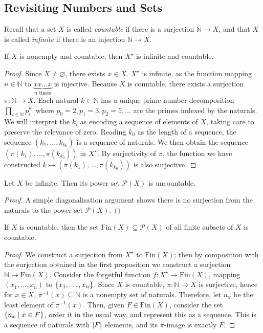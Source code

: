 \subsection{Revisiting Numbers and Sets}
Recall that a set \( X \) is called \emph{countable} if there is a surjection \( \mathbb N \to X \), and that \( X \) is called \emph{infinite} if there is an injection \( \mathbb N \to X \).
\begin{proposition}
	If \( X \) is nonempty and countable, then \( X^\star \) is infinite and countable.
\end{proposition}
\begin{proof}
	Since \( X \neq \varnothing \), there exists \( x \in X \).
	\( X^\star \) is infinite, as the function mapping \( n \in \mathbb N \) to \( \underbrace{xx\dots x}_{n \text{ times}} \) is injective.
	Because \( X \) is countable, there exists a surjection \( \pi : \mathbb N \to X \).
	Each natural \( k \in \mathbb N \) has a unique prime number decomposition \( \prod_{i \in \mathbb N} p_i^{k_i} \) where \( p_0 = 2, p_1 = 3, p_2 = 5, \dots \) are the primes indexed by the naturals.
	We will interpret the \( k_i \) as encoding a sequence of elements of \( X \), taking care to preserve the relevance of zero.
	Reading \( k_0 \) as the length of a sequence, the sequence \( (k_1, \dots, k_{k_0}) \) is a sequence of naturals.
	We then obtain the sequence \( (\pi(k_1), \dots, \pi(k_{k_0})) \) in \( X^\star \).
	By surjectivity of \( \pi \), the function we have constructed \( k \mapsto (\pi(k_1), \dots, \pi(k_{k_0})) \) is also surjective.
\end{proof}
\begin{theorem}
	Let \( X \) be infinite. Then its power set \( \mathcal P(X) \) is uncountable.
\end{theorem}
\begin{proof}
	A simple diagonalisation argument shows there is no surjection from the naturals to the power set \( \mathcal P(X) \).
\end{proof}
\begin{proposition}
	If \( X \) is countable, then the set \( \mathrm{Fin}(X) \subseteq \mathcal P(X) \) of all finite subsets of \( X \) is countable.
\end{proposition}
\begin{proof}
	We construct a surjection from \( X^\star \) to \( \mathrm{Fin}(X) \); then by composition with the surjection obtained in the first proposition we construct a surjection \( \mathbb N \to \mathrm{Fin}(X) \).
	Consider the forgetful function \( f \colon X^\star \to \mathrm{Fin}(X) \), mapping \( (x_1, \dots, x_n) \) to \( \qty{x_1, \dots, x_n} \).
	Since \( X \) is countable, \( \pi \colon \mathbb N \to X \) is surjective, hence for \( x \in X \), \( \pi^{-1}(x) \subseteq \mathbb N \) is a nonempty set of naturals.
	Therefore, let \( n_x \) be the least element of \( \pi^{-1}(x) \).
	Then, given \( F \in \mathrm{Fin}(X) \), consider the set \( \qty{n_x \mid x \in F} \), order it in the usual way, and represent this as a sequence.
	This is a sequence of naturals with \( \abs{F} \) elements, and its \( \pi \)-image is exactly \( F \).
\end{proof}

